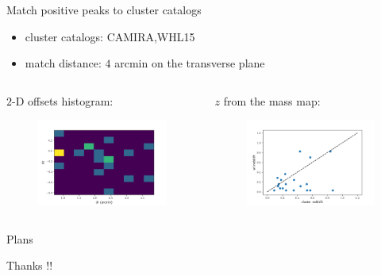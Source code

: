 \documentclass[9pt]{beamer}
\begin{document}
\begin{frame}{Match positive peaks to cluster catalogs}
    \begin{itemize}
        \item cluster catalogs: CAMIRA,WHL15
        \item match distance: $4$ arcmin on the transverse plane
    \end{itemize}
\begin{columns}[t]
    \begin{column}{0.5\textwidth}
    \alert{$2$-D offsets histogram:}
    \begin{figure}
    \centering
    \includegraphics[width=1.\textwidth]{dzdr.png}
    \end{figure}
    \end{column}
    \begin{column}{0.5\textwidth}
    \alert{$z$ from the mass map:}
    \begin{figure}
    \centering
    \includegraphics[width=1.\textwidth]{redshift_bias.png}
    \end{figure}
    \end{column}
\end{columns}
\end{frame}

\begin{frame}{Plans}
    \begin{Huge}
        Thanks !!
    \end{Huge}
\end{frame}
\end{document}
